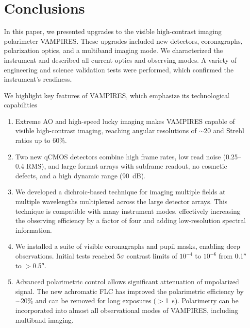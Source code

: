 \section{Conclusions}\label{sec:conclusions}

In this paper, we presented upgrades to the visible high-contrast imaging polarimeter VAMPIRES. These upgrades included new detectors, coronagraphs, polarization optics, and a multiband imaging mode. We characterized the instrument and described all current optics and observing modes. A variety of engineering and science validation tests were performed, which confirmed the instrument's readiness.

We highlight key features of VAMPIRES, which emphasize its technological capabilities
\begin{enumerate}
    \item Extreme AO and high-speed lucky imaging makes VAMPIRES capable of visible high-contrast imaging, reaching angular resolutions of $\sim$\SI{20}{\mas} and Strehl ratios up to 60\%.
    \item Two new qCMOS detectors combine high frame rates, low read noise (\SIrange{0.25}{0.4}{\electron} RMS), and large format arrays with subframe readout, no cosmetic defects, and a high dynamic range (\SI{90}{\deci\bel}).
    \item We developed a dichroic-based technique for imaging multiple fields at multiple wavelengths multiplexed across the large detector arrays. This technique is compatible with many instrument modes, effectively increasing the observing efficiency by a factor of four and adding low-resolution spectral information.
    \item We installed a suite of visible coronagraphs and pupil masks, enabling deep observations. Initial tests reached 5$\sigma$ contrast limits of $10^{-4}$ to $10^{-6}$ from \ang{;;0.1} to $>$\ang{;;0.5}.
    \item Advanced polarimetric control allows significant attenuation of unpolarized signal. The new achromatic FLC has improved the polarimetric efficiency by $\sim$20\% and can be removed for long exposures ($>$\SI{1}{\second}). Polarimetry can be incorporated into almost all observational modes of VAMPIRES, including multiband imaging.
\end{enumerate}

